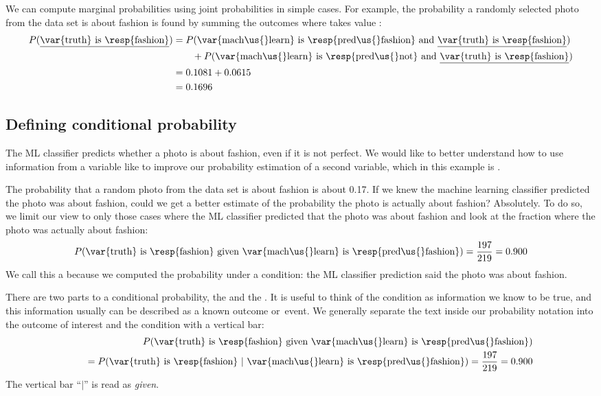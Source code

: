 We can compute marginal probabilities using joint probabilities
in simple cases.
For example, the probability a randomly selected photo from the
data set is about fashion is found by summing the outcomes where
 takes value :%
\newcommand{\ultruthfashion}[0]
    {\underline{\var{truth} is \resp{fashion}}}%
\begin{align*}
P(\text{\ultruthfashion{}})
  &= P(\text{\var{mach\us{}learn} is \resp{pred\us{}fashion}
        and \ultruthfashion{}}) \\
    & \qquad + P(\text{\var{mach\us{}learn} is \resp{pred\us{}not}
        and \ultruthfashion{}}) \\
  &= 0.1081 + 0.0615 \\
  &= 0.1696
\end{align*}


\subsection{Defining conditional probability}


The ML classifier predicts whether a photo is about fashion,
even if it is not perfect.
We would like to better understand how to use information
from a variable like  to improve our
probability estimation of a second variable, which in this
example is .

The probability that a random photo from the data set is about
fashion is about 0.17.
If we knew the machine learning classifier predicted the
photo was about fashion, could we get a better estimate of the
probability the photo is actually about fashion?
Absolutely.
To do so, we limit our view to only those \fashYA{} cases
where the ML classifier predicted that the photo was about
fashion and look at the fraction where the photo was actually
about fashion:
\begin{align*}
P(\text{\var{truth} is \resp{fashion} given
    \var{mach\us{}learn} is \resp{pred\us{}fashion}})
  = \frac{\fashYY{}}{\fashYA{}}
  = 0.900
\end{align*}
We call this a  because
we computed the probability under a condition:
the ML classifier prediction said the photo was about fashion.

There are two parts to a conditional probability,
the  and the .
It is useful to think of the condition as information we know
to be true, and this information usually can be described as
a known outcome or~event.
We generally separate the text inside our probability notation
into the outcome of interest and the condition with a
vertical bar:
\begin{align*}
&& P(\text{\var{truth} is \resp{fashion} given
    \var{mach\us{}learn} is \resp{pred\us{}fashion}}) \\
&& \quad = P(\text{\var{truth} is \resp{fashion}\ }|
    \text{\ \var{mach\us{}learn} is \resp{pred\us{}fashion}})
  = \frac{\fashYY{}}{\fashYA{}}
  = 0.900
\end{align*}
The vertical bar ``$|$'' is read as \emph{given}.

